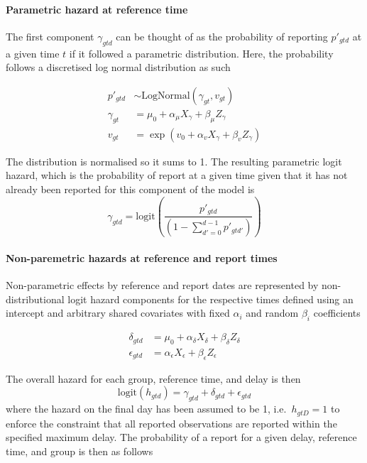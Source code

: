 \documentclass[
  a4paper,
]{article}
\let\oldparagraph\paragraph
\renewcommand{\paragraph}[1]{\oldparagraph{#1}\mbox{}}
\begin{document}
\hypertarget{parametric-hazard-at-reference-time}{%
\paragraph{Parametric hazard at reference
time}\label{parametric-hazard-at-reference-time}}

The first component \(\gamma_{gtd}\) can be thought of as the
probability of reporting \(p'_{gtd}\) at a given time \(t\) if it
followed a parametric distribution. Here, the probability follows a
discretised log normal distribution as such

\[
\begin{aligned}
p'_{gtd} &\sim \text{LogNormal}(\gamma_{gt},v_{gt})\\
\gamma_{gt} &= \mu_0 + \alpha_\mu X_{\gamma}+\beta_\mu Z_\gamma\\
v_{gt} &= \exp\left(v_0 + \alpha_v X_\gamma + \beta_v Z_\gamma\right)
\end{aligned}
\]

The distribution is normalised so it sums to 1. The resulting parametric
logit hazard, which is the probability of report at a given time given
that it has not already been reported for this component of the model is
\[\gamma_{gtd} = \text{logit}\left(\frac{p'_{gtd}}{\left(1-\sum_{d'=0}^{d-1}p'_{gtd'}\right)}\right)\]

\hypertarget{non-paremetric-hazards-at-reference-and-report-times}{%
\paragraph{Non-paremetric hazards at reference and report
times}\label{non-paremetric-hazards-at-reference-and-report-times}}

Non-parametric effects by reference and report dates are represented by
non-distributional logit hazard components for the respective times
defined using an intercept and arbitrary shared covariates with fixed
\(\alpha_i\) and random \(\beta_i\) coefficients

\[
\begin{aligned}
\delta_{gtd} &= \mu_0 + \alpha_\delta X_\delta + \beta_\delta Z_\delta \\ 
\epsilon_{gtd} &= \alpha_\epsilon X_\epsilon + \beta_\epsilon Z_\epsilon
\end{aligned}
\]

The overall hazard for each group, reference time, and delay is then
\[\text{logit}(h_{gtd}) = \gamma_{gtd}+\delta_{gtd}+\epsilon_{gtd}\]
where the hazard on the final day has been assumed to be 1,
i.e.~\(h_{gtD}=1\) to enforce the constraint that all reported
observations are reported within the specified maximum delay. The
probability of a report for a given delay, reference time, and group is
then as follows
\end{document}
